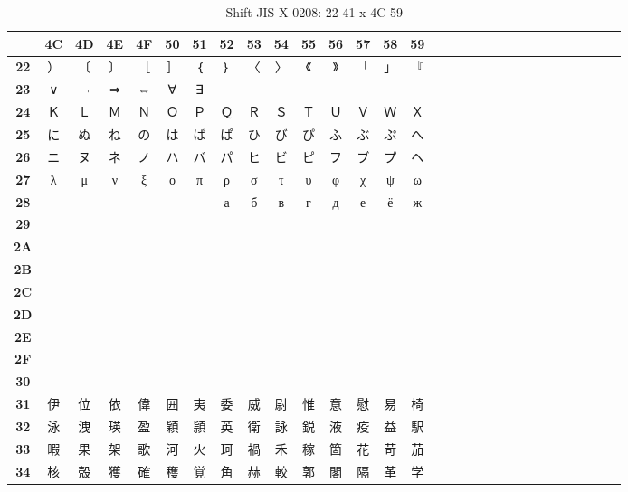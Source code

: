 \begin{table}[H]
\Fontified
\centering
\caption{Shift JIS X 0208: 22-41 x 4C-59}
\begin{tabular}{|Sc|Sc|Sc|Sc|Sc|Sc|Sc|Sc|Sc|Sc|Sc|Sc|Sc|Sc|Sc|}
\hline
 & \textbf{4C} & \textbf{4D} & \textbf{4E} & \textbf{4F} & \textbf{50} & \textbf{51} & \textbf{52} & \textbf{53} & \textbf{54} & \textbf{55} & \textbf{56} & \textbf{57} & \textbf{58} & \textbf{59} \\ \hline
\textbf{22} & ） & 〔 & 〕 & ［ & ］ & ｛ & ｝ & 〈 & 〉 & 《 & 》 & 「 & 」 & 『 \\ \hline
\textbf{23} & ∨ & ¬ & ⇒ & ⇔ & ∀ & ∃ &  &  &  &  &  &  &  &  \\ \hline
\textbf{24} & Ｋ & Ｌ & Ｍ & Ｎ & Ｏ & Ｐ & Ｑ & Ｒ & Ｓ & Ｔ & Ｕ & Ｖ & Ｗ & Ｘ \\ \hline
\textbf{25} & に & ぬ & ね & の & は & ば & ぱ & ひ & び & ぴ & ふ & ぶ & ぷ & へ \\ \hline
\textbf{26} & ニ & ヌ & ネ & ノ & ハ & バ & パ & ヒ & ビ & ピ & フ & ブ & プ & ヘ \\ \hline
\textbf{27} & λ & μ & ν & ξ & ο & π & ρ & σ & τ & υ & φ & χ & ψ & ω \\ \hline
\textbf{28} &  &  &  &  &  &  & а & б & в & г & д & е & ё & ж \\ \hline
\textbf{29} &  &  &  &  &  &  &  &  &  &  &  &  &  &  \\ \hline
\textbf{2A} &  &  &  &  &  &  &  &  &  &  &  &  &  &  \\ \hline
\textbf{2B} &  &  &  &  &  &  &  &  &  &  &  &  &  &  \\ \hline
\textbf{2C} &  &  &  &  &  &  &  &  &  &  &  &  &  &  \\ \hline
\textbf{2D} &  &  &  &  &  &  &  &  &  &  &  &  &  &  \\ \hline
\textbf{2E} &  &  &  &  &  &  &  &  &  &  &  &  &  &  \\ \hline
\textbf{2F} &  &  &  &  &  &  &  &  &  &  &  &  &  &  \\ \hline
\textbf{30} &  &  &  &  &  &  &  &  &  &  &  &  &  &  \\ \hline
\textbf{31} & 伊 & 位 & 依 & 偉 & 囲 & 夷 & 委 & 威 & 尉 & 惟 & 意 & 慰 & 易 & 椅 \\ \hline
\textbf{32} & 泳 & 洩 & 瑛 & 盈 & 穎 & 頴 & 英 & 衛 & 詠 & 鋭 & 液 & 疫 & 益 & 駅 \\ \hline
\textbf{33} & 暇 & 果 & 架 & 歌 & 河 & 火 & 珂 & 禍 & 禾 & 稼 & 箇 & 花 & 苛 & 茄 \\ \hline
\textbf{34} & 核 & 殻 & 獲 & 確 & 穫 & 覚 & 角 & 赫 & 較 & 郭 & 閣 & 隔 & 革 & 学 \\ \hline

\end{tabular}
\end{table}
